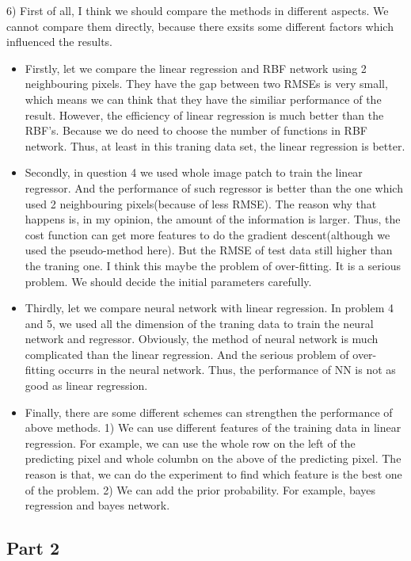 \documentclass{article}
\begin{document}


6) First of all, I think we should compare the methods in different aspects. We cannot compare them directly, because there exsits some different factors which influenced the results.

\begin{itemize}
  \item Firstly, let we compare the linear regression and RBF network using 2 neighbouring pixels. They have the gap between two RMSEs is very small, which means we can think that they have the
      similiar performance of the result. However, the efficiency of linear regression is much better than the RBF's. Because we do need to choose the number of functions in RBF network. Thus, at least in
      this traning data set, the linear regression is better.
  \item Secondly, in question 4 we used whole image patch to train the linear regressor. And the performance of such regressor is better than the one which used 2 neighbouring pixels(because of less RMSE).
      The reason why that happens is, in my opinion, the amount of the information is larger. Thus, the cost function can get more features to do the gradient descent(although we used the pseudo-method here).
      But the RMSE of test data still higher than the traning one. I think this maybe the problem of over-fitting. It is a serious problem. We should decide the initial parameters carefully.
  \item Thirdly, let we compare neural network with linear regression. In problem 4 and 5, we used all the dimension of the traning data to train the neural network and regressor. Obviously, the method of neural
      network is much complicated than the linear regression. And the serious problem of over-fitting occurrs in the neural network. Thus, the performance of NN is not as good as linear regression.
  \item Finally, there are some different schemes can strengthen the performance of above methods. 
      1) We can use different features of the training data in linear regression. For example, we can use the whole row on
      the left of the predicting pixel and whole columbn on the above of the predicting pixel. The reason is that, we can do the experiment to find which feature is the best one of the problem. 
      2) We can add the prior probability. For example, bayes regression and bayes network.
\end{itemize}

\subsection*{Part 2}
\end{document}
